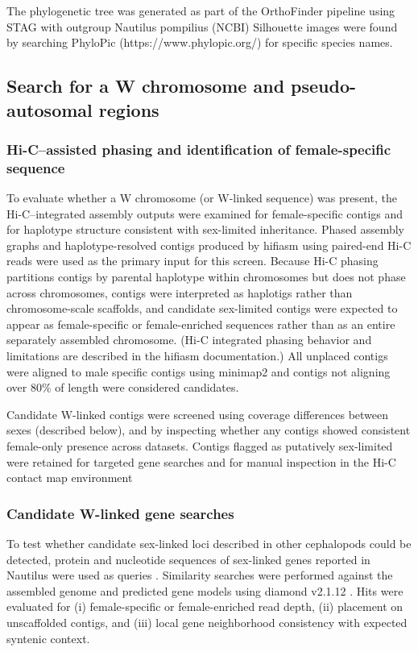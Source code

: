 \documentclass[11pt]{article}
\begin{document}
The phylogenetic tree was generated as part of the OrthoFinder pipeline using STAG \cite{EmmsStag2018} with outgroup Nautilus pompilius (NCBI) Silhouette images were found by searching PhyloPic (https://www.phylopic.org/) for specific species names. 


\subsection{Search for a W chromosome and pseudo-autosomal regions}

\subsubsection{Hi-C–assisted phasing and identification of female-specific sequence}

To evaluate whether a W chromosome (or W-linked sequence) was present, the Hi-C–integrated assembly outputs were examined for female-specific contigs and for haplotype structure consistent with sex-limited inheritance. Phased assembly graphs and haplotype-resolved contigs produced by hifiasm using paired-end Hi-C reads were used as the primary input for this screen. Because Hi-C phasing partitions contigs by parental haplotype within chromosomes but does not phase across chromosomes, contigs were interpreted as haplotigs rather than chromosome-scale scaffolds, and candidate sex-limited contigs were expected to appear as female-specific or female-enriched sequences rather than as an entire separately assembled chromosome. (Hi-C integrated phasing behavior and limitations are described in the hifiasm documentation.) All unplaced contigs were aligned to male specific contigs using minimap2 and contigs not aligning over 80\% of length were considered candidates. 

Candidate W-linked contigs were screened using coverage differences between sexes (described below), and by inspecting whether any contigs showed consistent female-only presence across datasets. Contigs flagged as putatively sex-limited were retained for targeted gene searches and for manual inspection in the Hi-C contact map environment

\subsubsection{Candidate W-linked gene searches }

To test whether candidate sex-linked loci described in other cephalopods could be detected, protein and nucleotide sequences of sex-linked genes reported in Nautilus were used as queries \cite{Torrado2025NautilusSex}. Similarity searches were performed against the assembled genome and predicted gene models using diamond v2.1.12 \cite{Buchfink2021DIAMOND}. Hits were evaluated for (i) female-specific or female-enriched read depth, (ii) placement on unscaffolded contigs, and (iii) local gene neighborhood consistency with expected syntenic context.
\end{document}
